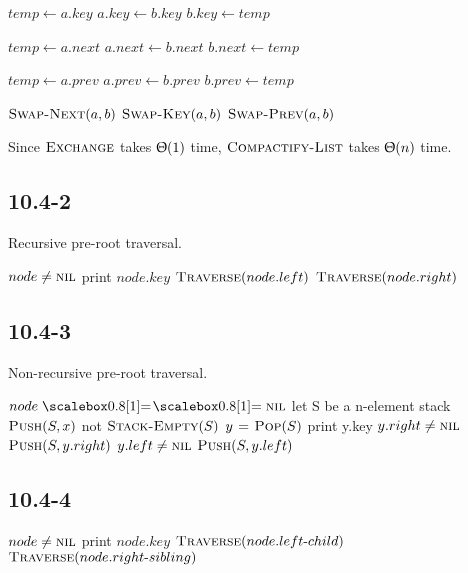 \documentclass{book}
\begin{document}
\begin{CJK}{UTF8}{gkai}
\begin{codebox}
\li $temp \gets a.key$
\li $a.key \gets b.key$
\li $b.key \gets temp$
\end{codebox}

\begin{codebox}
\li $temp \gets a.next$
\li $a.next \gets b.next$
\li $b.next \gets temp$
\end{codebox}

\begin{codebox}
\li $temp \gets a.prev$
\li $a.prev \gets b.prev$
\li $b.prev \gets temp$
\end{codebox}

\begin{codebox}
\li $\textnormal{\scshape Swap-Next}(a,b)$
\li $\textnormal{\scshape Swap-Key}(a,b)$
\li $\textnormal{\scshape Swap-Prev}(a,b)$
\end{codebox}

Since $\textnormal{\scshape Exchange}$ takes $\Uptheta(1)$ time, $\textnormal{\scshape Compactify-List}$ takes 
$\Uptheta(n)$ time.

\subsection*{10.4-2}
Recursive pre-root traversal.
\begin{codebox}
\li \If $node \ne \textnormal{\scshape nil}$
\li \Then print $node.key$
\li $\textnormal{\scshape Traverse}(node.left)$
\li $\textnormal{\scshape Traverse}(node.right)$
\End
\end{codebox}

\subsection*{10.4-3}
Non-recursive pre-root traversal.
\begin{codebox}
\li \If $node \isequal \const{nil}$
\li \Then \Return
\End
\li let S be a n-element stack
\li $\textnormal{\scshape Push}(S,x)$
\li \While not $\textnormal{\scshape Stack-Empty}(S)$
\li \Do $y \mathrel{\hspace{1pt}=\hspace{1pt}} \textnormal{\scshape Pop}(S)$
\li print y.key
\li \If $y.right \ne \textnormal{\scshape nil}$
\li \Then $\textnormal{\scshape Push}(S, y.right)$
\End
\li \If $y.left \ne \textnormal{\scshape nil}$
\li \Then $\textnormal{\scshape Push}(S, y.left)$
\End
\end{codebox}

\subsection*{10.4-4}
\begin{codebox}
\li \If $node \ne \textnormal{\scshape nil}$
\li \Then print $node.key$
\li $\textnormal{\scshape Traverse}(node.left\text{-}child)$
\li $\textnormal{\scshape Traverse}(node.right\text{-}sibling)$
\End
\end{codebox}


\end{CJK}
\end{document}
